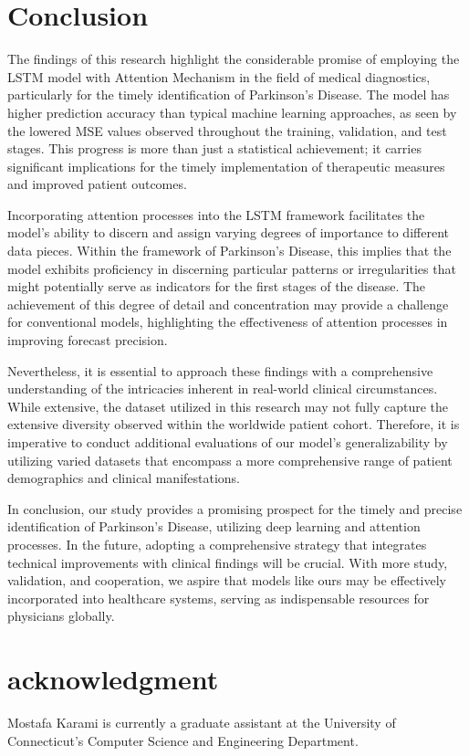 \section{Conclusion}

The findings of this research highlight the considerable promise of employing the LSTM model with Attention Mechanism in the field of medical diagnostics, particularly for the timely identification of Parkinson's Disease. The model has higher prediction accuracy than typical machine learning approaches, as seen by the lowered MSE values observed throughout the training, validation, and test stages. This progress is more than just a statistical achievement; it carries significant implications for the timely implementation of therapeutic measures and improved patient outcomes.

Incorporating attention processes into the LSTM framework facilitates the model's ability to discern and assign varying degrees of importance to different data pieces. Within the framework of Parkinson's Disease, this implies that the model exhibits proficiency in discerning particular patterns or irregularities that might potentially serve as indicators for the first stages of the disease. The achievement of this degree of detail and concentration may provide a challenge for conventional models, highlighting the effectiveness of attention processes in improving forecast precision.

Nevertheless, it is essential to approach these findings with a comprehensive understanding of the intricacies inherent in real-world clinical circumstances. While extensive, the dataset utilized in this research may not fully capture the extensive diversity observed within the worldwide patient cohort. Therefore, it is imperative to conduct additional evaluations of our model's generalizability by utilizing varied datasets that encompass a more comprehensive range of patient demographics and clinical manifestations.

In conclusion, our study provides a promising prospect for the timely and precise identification of Parkinson's Disease, utilizing deep learning and attention processes. In the future, adopting a comprehensive strategy that integrates technical improvements with clinical findings will be crucial. With more study, validation, and cooperation, we aspire that models like ours may be effectively incorporated into healthcare systems, serving as indispensable resources for physicians globally.

\section{acknowledgment}
Mostafa Karami is currently a graduate assistant at the University of Connecticut's Computer Science and Engineering Department.

